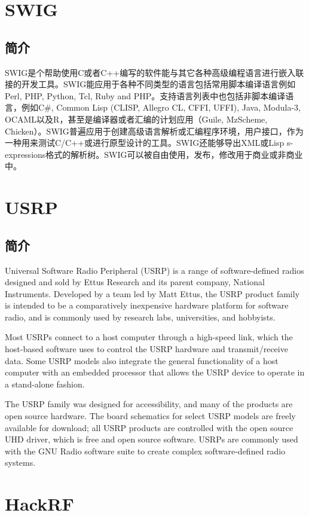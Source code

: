 \section{SWIG}
	\subsection{简介}
	\par SWIG是个帮助使用C或者C++编写的软件能与其它各种高级编程语言进行嵌入联接的开发工具。SWIG能应用于各种不同类型的语言包括常用脚本编译语言例如Perl, PHP, Python, Tcl, Ruby and PHP。支持语言列表中也包括非脚本编译语言，例如C\#, Common Lisp (CLISP, Allegro CL, CFFI, UFFI), Java, Modula-3, OCAML以及R，甚至是编译器或者汇编的计划应用（Guile, MzScheme, Chicken）。SWIG普遍应用于创建高级语言解析或汇编程序环境，用户接口，作为一种用来测试C/C++或进行原型设计的工具。SWIG还能够导出XML或Lisp s-expressions格式的解析树。SWIG可以被自由使用，发布，修改用于商业或非商业中。\cite{ wiki:SWIG}
\section{USRP}
	\subsection{简介}
	\par Universal Software Radio Peripheral (USRP) is a range of software-defined radios designed and sold by Ettus Research and its parent company, National Instruments. Developed by a team led by Matt Ettus, the USRP product family is intended to be a comparatively inexpensive hardware platform for software radio, and is commonly used by research labs, universities, and hobbyists.
	\par Most USRPs connect to a host computer through a high-speed link, which the host-based software uses to control the USRP hardware and transmit/receive data. Some USRP models also integrate the general functionality of a host computer with an embedded processor that allows the USRP device to operate in a stand-alone fashion.
	\par The USRP family was designed for accessibility, and many of the products are open source hardware. The board schematics for select USRP models are freely available for download; all USRP products are controlled with the open source UHD driver, which is free and open source software. USRPs are commonly used with the GNU Radio software suite to create complex software-defined radio systems. \cite{ wiki:USRP}
\section{HackRF}
